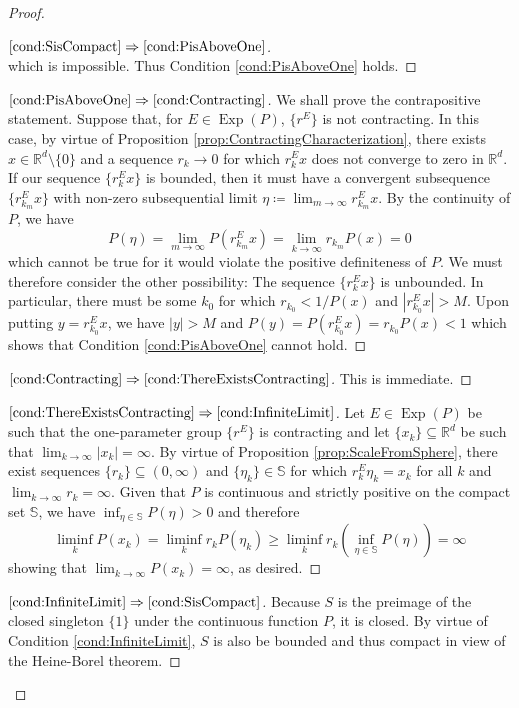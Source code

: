 \documentclass[11pt, letter]{book}
\newcommand*{\myproofname}{Proof}
\newenvironment{subproof}[1][\myproofname]{\begin{proof}[#1]\renewcommand*{\qedsymbol}{$\mathbin{/\mkern-6mu/}$}}{\end{proof}}
\newcommand\Exp{\operatorname{Exp}}
\begin{document}
\begin{proof}
\begin{subproof}[$\ref{cond:SisCompact}\Rightarrow\ref{cond:PisAboveOne}$]
\begin{equation*}
\end{equation*}
which is impossible. Thus Condition \ref{cond:PisAboveOne} holds.
\end{subproof}
\begin{subproof}[$\ref{cond:PisAboveOne}\Rightarrow\ref{cond:Contracting}$]
We shall prove the contrapositive statement. Suppose that, for $E\in\Exp(P)$, $\{r^E\}$ is not contracting. In this case, by virtue of Proposition \ref{prop:ContractingCharacterization}, there exists $x\in\mathbb{R}^d\setminus\{0\}$ and a sequence $r_k\to 0$ for which $r_k^Ex$ does not converge to zero in $\mathbb{R}^d$. If our sequence $\{r_k^Ex\}$ is bounded, then it must have a convergent subsequence $\{r_{k_m}^Ex\}$ with non-zero subsequential limit $\eta\coloneqq\lim_{m\to\infty}r_{k_m}^Ex$. By the continuity of $P$, we have
\begin{equation*}
P(\eta)=\lim_{m\to\infty}P(r_{k_m}^Ex)=\lim_{k\to\infty}r_{k_m}P(x)=0
\end{equation*}
which cannot be true for it would violate the positive definiteness of $P$. We must therefore consider the other possibility: The sequence $\{r_k^Ex\}$ is unbounded. In particular, there must be some $k_0$ for which $r_{k_0}<1/P(x)$ and $|r_{k_0}^Ex|>M$. Upon putting $y=r_{k_0}^Ex$, we have $|y|>M$ and  $P(y)=P(r_{k_0}^Ex)=r_{k_0}P(x)<1$ which shows that Condition \ref{cond:PisAboveOne} cannot hold.
\end{subproof}
\begin{subproof}[$\ref{cond:Contracting}\Rightarrow\ref{cond:ThereExistsContracting}$] This is immediate.
\end{subproof}
\begin{subproof}[$\ref{cond:ThereExistsContracting}\Rightarrow\ref{cond:InfiniteLimit}$]
Let $E\in\Exp(P)$ be such that the one-parameter group $\{r^E\}$ is contracting and let $\{x_k\}\subseteq\mathbb{R}^d$ be such that $\lim_{k\to\infty}|x_k|=\infty$. By virtue of Proposition \ref{prop:ScaleFromSphere}, there exist sequences $\{r_k\}\subseteq (0,\infty)$ and $\{\eta_k\}\in\mathbb{S}$ for which $r_k^E\eta_k=x_k$ for all $k$ and $\lim_{k\to\infty}r_k=\infty$. Given that $P$ is continuous and strictly positive on the compact set $\mathbb{S}$, we have $\inf_{\eta\in\mathbb{S}}P(\eta)>0$ and therefore
\begin{equation*}
\liminf_k P(x_k)=\liminf_k r_kP(\eta_k)\geq \liminf_k r_k\left(\inf_{\eta\in\mathbb{S}}P(\eta)\right)=\infty
\end{equation*}
showing that $\lim_{k\to\infty} P(x_k)=\infty$, as desired.
\end{subproof}
\begin{subproof}[$\ref{cond:InfiniteLimit}\Rightarrow\ref{cond:SisCompact}$]
Because $S$ is the preimage of the closed singleton $\{1\}$ under the continuous function $P$, it is closed. By virtue of Condition \ref{cond:InfiniteLimit}, $S$ is also be bounded and thus compact in view of the Heine-Borel theorem.
\end{subproof}
\end{proof}
\end{document}
